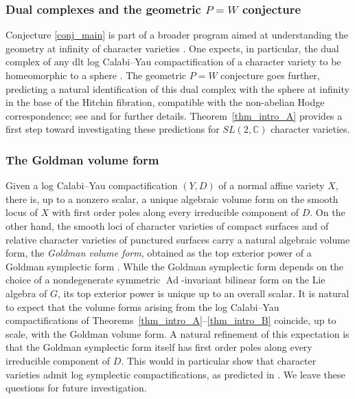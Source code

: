 \documentclass[12pt,letterpaper, reqno]{amsart}
\theoremstyle{defstyle} \newtheorem{definition}[theorem]{Definition}
\theoremstyle{remark}
\numberwithin{equation}{section}
\numberwithin{figure}{section}
\newcommand{\CC} {\mathbb{C}}
\begin{document}
\subsubsection{Dual complexes and the geometric $P=W$ conjecture}
Conjecture \ref{conj_main} is part of a broader program aimed at understanding the geometry at infinity of character varieties \cite{KNPS, mauri2022geometric}. One expects, in particular, the dual complex of any dlt log Calabi--Yau compactification of a character variety to be homeomorphic to a sphere \cite[Conjecture 1.3.1]{mauri2022geometric}. The geometric $P=W$ conjecture goes further, predicting a natural identification of this dual complex with the sphere at infinity in the base of the Hitchin fibration, compatible with the non-abelian Hodge correspondence; see \cite{KNPS} and \cite[Conjecture 4.2.7]{mauri2022geometric} for further details. Theorem~\ref{thm_intro_A} provides a first step toward investigating these predictions for $SL(2,\CC)$ character varieties.

\subsubsection{The Goldman volume form} 
Given a log Calabi--Yau compactification $(Y,D)$ of a normal affine variety $X$, there is, up to a nonzero scalar, a unique algebraic volume form on the smooth locus of $X$ with first order poles along every irreducible component of $D$. On the other hand, the smooth loci of character varieties of compact surfaces and of relative character varieties of punctured surfaces carry a natural algebraic volume form, the \emph{Goldman volume form}, obtained as the top exterior power of a Goldman symplectic form \cite{AMM, atiyahbott, boalch, FR, goldman, GHJW, sikora}. While the Goldman symplectic form depends on the choice of a nondegenerate symmetric $\operatorname{Ad}$-invariant bilinear form on the Lie algebra of $G$, its top exterior power is unique up to an overall scalar. It is natural to expect that the volume forms arising from the log Calabi--Yau compactifications of Theorems~\ref{thm_intro_A}--\ref{thm_intro_B} coincide, up to scale, with the Goldman volume form. A natural refinement of this expectation is that the Goldman symplectic form itself has first order poles along every irreducible component of $D$. This would in particular show that character varieties admit log symplectic compactifications, as predicted in \cite[Conjecture 5.4]{mauriintro}. We leave these questions for future investigation.
\end{document}
